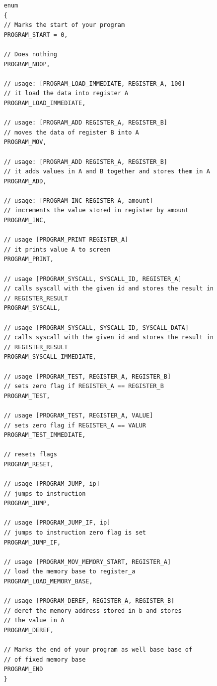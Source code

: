\documentclass[12pt]{report}
\begin{document}
    \begin{verbatim}
    enum 
    {
    // Marks the start of your program
    PROGRAM_START = 0,
    
    // Does nothing
    PROGRAM_NOOP,
    
    // usage: [PROGRAM_LOAD_IMMEDIATE, REGISTER_A, 100]
    // it load the data into register A
    PROGRAM_LOAD_IMMEDIATE,

    // usage: [PROGRAM_ADD REGISTER_A, REGISTER_B] 
    // moves the data of register B into A
    PROGRAM_MOV,
  
    // usage: [PROGRAM_ADD REGISTER_A, REGISTER_B] 
    // it adds values in A and B together and stores them in A
    PROGRAM_ADD,

    // usage: [PROGRAM_INC REGISTER_A, amount] 
    // increments the value stored in register by amount
    PROGRAM_INC,

    // usage [PROGRAM_PRINT REGISTER_A]
    // it prints value A to screen
    PROGRAM_PRINT, 

    // usage [PROGRAM_SYSCALL, SYSCALL_ID, REGISTER_A]
    // calls syscall with the given id and stores the result in
    // REGISTER_RESULT
    PROGRAM_SYSCALL,

    // usage [PROGRAM_SYSCALL, SYSCALL_ID, SYSCALL_DATA]
    // calls syscall with the given id and stores the result in
    // REGISTER_RESULT
    PROGRAM_SYSCALL_IMMEDIATE,

    // usage [PROGRAM_TEST, REGISTER_A, REGISTER_B]
    // sets zero flag if REGISTER_A == REGISTER_B
    PROGRAM_TEST,

    // usage [PROGRAM_TEST, REGISTER_A, VALUE]
    // sets zero flag if REGISTER_A == VALUR
    PROGRAM_TEST_IMMEDIATE,

    // resets flags
    PROGRAM_RESET,

    // usage [PROGRAM_JUMP, ip]
    // jumps to instruction
    PROGRAM_JUMP,
  
    // usage [PROGRAM_JUMP_IF, ip]
    // jumps to instruction zero flag is set
    PROGRAM_JUMP_IF,

    // usage [PROGRAM_MOV_MEMORY_START, REGISTER_A]
    // load the memory base to register_a
    PROGRAM_LOAD_MEMORY_BASE,

    // usage [PROGRAM_DEREF, REGISTER_A, REGISTER_B]
    // deref the memory address stored in b and stores
    // the value in A
    PROGRAM_DEREF,

    // Marks the end of your program as well base base of 
    // of fixed memory base
    PROGRAM_END
    }
    \end{verbatim}
\end{document}
